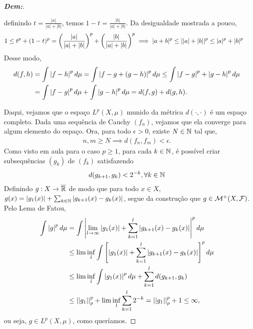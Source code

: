 \begin{proof}[\textbf{Dem:}]
\begin{itemize}
    definindo $t = \frac{|a|}{|a| + |b|}$, temos $1 - t = \frac{|b|}{|a| + |b|}$. 
    Da desigualdade mostrada a pouco, 
    \begin{align*}
      &1 \le t^p + (1-t)^p = \parth{\frac{|a|}{|a|+|b|}}^p + \parth{\frac{|b|}{|a|+|b|}}^p
      \implies |a+b|^p\le ||a|+|b||^p \le |a|^p + |b|^p
    \end{align*}
    Desse modo, 
    \begin{align*}
      d(f, h) &= \int \mparth{f - h}^p d\mu = \int \mparth {f - g + (g - h)}^p d\mu  
      \le \int \mparth{f - g}^p + \mparth{g - h}^p d\mu\\ &= \int \mparth{f - g}^p d\mu 
      + \int \mparth{g - h}^p d\mu 
      = d(f, g) + d(g, h).
    \end{align*}
\end{itemize}
  Daqui, vejamos que o espaço $L^p(X, \mu)$ munido da métrica $d(\cdot, \cdot)$ 
  é um espaço completo. Dada uma sequência de Cauchy $(f_n)$, vejamos que 
  ela converge para algum elemento do espaço. Ora, para todo $\epsilon>0$, 
  existe $N \in \bN$ tal que, 
  \begin{align*}
    n, m \ge N \implies d(f_n, f_m) < \epsilon.
  \end{align*}
  Como visto em aula para o caso $p \ge 1$, para cada $k \in \bN$, 
  é possível criar subsequências $(g_k)$ de $(f_k)$ satisfazendo 
  \begin{align*}
    d(g_{k + 1}, g_k) < 2^{-k}, \forall k \in \bN
  \end{align*}
  Definindo $g: X \rightarrow \xbR$ de modo que 
  para todo $x \in X$, $g(x) = \mparth{g_1(x)} + \sum_{k \in \bN}\mparth{g_{k+1}(x)-g_k(x)}$,
  segue da construção que $g \in \mcal M^+(X, \mcal F)$. Pelo Lema de Fatou,
  \begin{align*}
    \int \mparth{g}^p d\mu &= \int \mparth{\lim_{l \rightarrow \infty} \mparth{g_1(x)} 
    + \sum_{k = 1}^{l}\mparth{g_{k+1}(x)-g_k(x)}}^pd\mu\\
    &\le \lim\inf_{l} \int \cparth{\mparth{g_1(x)}
    +\sum_{k=1}^l\mparth{g_{k+1}(x) - g_k(x)}}^pd\mu\\
    &\le \lim\inf_{l} \int \mparth{g_1(x)}^p d\mu + \sum_{k = 1}^l d(g_{k+1}, g_k)\\
    &\le \pnorm p {g_1}^p + \lim\inf_{l} \sum_{k=1}^l 2^{-k} = \pnorm p {g_1}^p + 1 \le \infty,
  \end{align*}
  ou seja, $g \in L^p(X, \mu)$, como queríamos.
\end{proof}


